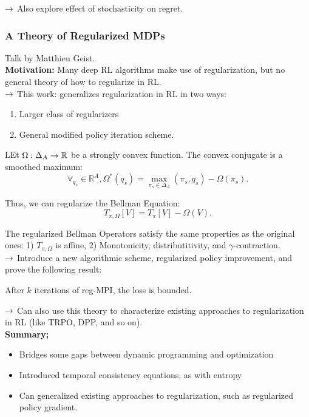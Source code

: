$\rightarrow$ Also explore effect of stochasticity on regret. \\

\spacerule

\subsubsection{A Theory of Regularized MDPs}

Talk by Matthieu Geist. \\

{\bf Motivation:} Many deep RL algorithms make use of regularization, but no general theory of how to regularize in RL. \\

$\rightarrow$ This work: generalizes regularization in RL in two ways:
\begin{enumerate}
    \item Larger class of regularizers
    \item General modified policy iteration scheme.
\end{enumerate}

LEt $\Omega : \Delta_A \rightarrow \mathbb{R}$ be a strongly convex function. The convex conjugate is a smoothed maximum:
\[
\forall_{q_s} \in \mathbb{R}^A, \Omega^*(q_s) = \max_{\pi_s \in \Delta_A} (\pi_s, q_s) - \Omega(\pi_s).
\]

Thus, we can regularize the Bellman Equation:
\begin{equation}
    T_{\pi,\Omega}[V] = T_\pi[V] - \Omega(V).
\end{equation}

The regularized Bellman Operators satisfy the same properties as the original ones: 1) $T_{\pi, \Omega}$ is affine, 2) Monotonicity, distributitivity, and $\gamma$-contraction. \\

$\rightarrow$ Introduce a new algorithmic scheme, regularized policy improvement, and prove the following result:

\begin{theorem}
After $k$ iterations of reg-MPI, the loss is bounded.
\end{theorem}

$\rightarrow$ Can also use this theory to characterize existing approaches to regularization in RL (like TRPO, DPP, and so on). \\

{\bf Summary;}
\begin{itemize}
    \item Bridges some gaps between dynamic programming and optimization
    \item Introduced temporal consistency equations, as with entropy
    \item Can generalized existing approaches to regularization, such as regularized policy gradient.
\end{itemize}


